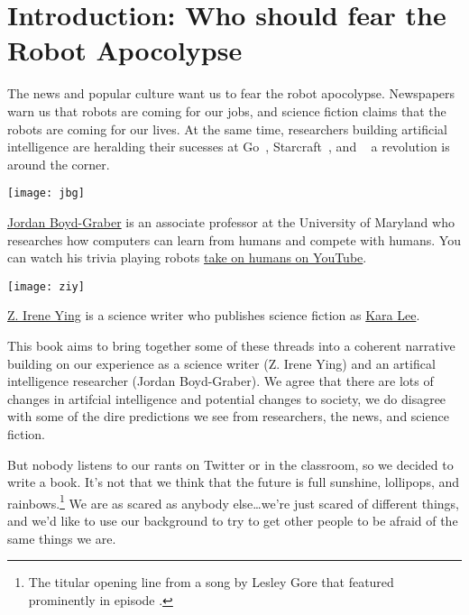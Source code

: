 \cleardoublepage
\chapter{Introduction: Who should fear the Robot Apocolypse}

The news and popular culture want us to fear the robot apocolypse.  Newspapers warn us that robots are coming for our jobs, and science fiction claims that the robots are coming for our lives.  At the same time, researchers building artificial intelligence are heralding their sucesses at Go~\cite{silver-16}, Starcraft~\cite{vinyals2017starcraft}, and ~\cite{ferruci-10} a revolution is around the corner.

\begin{marginfigure}%
  \texttt{[image: jbg]}
  \caption{\href{http://boydgraber.org}{Jordan Boyd-Graber} is an associate professor at the University of Maryland who researches how computers can learn from humans and compete with humans.  You can watch his trivia playing robots \href{http://qanta.org/home/past-events}{take on humans on YouTube}.}
  \label{fig:marginfig}
\end{marginfigure}

\begin{marginfigure}%
  \texttt{[image: ziy]}
  \caption{\href{http://www.ireneying.net/}{Z. Irene Ying} is a science writer who publishes science fiction as \href{http://www.windupdreams.net/}{Kara Lee}.}
  \label{fig:marginfig}
\end{marginfigure}

This book aims to bring together some of these threads into a coherent narrative building on our experience as a science writer (Z. Irene Ying) and an artifical intelligence researcher (Jordan Boyd-Graber).  We agree that there are lots of changes in artifcial intelligence and potential changes to society, we do disagree with some of the dire predictions we see from researchers, the news, and science fiction.

But nobody listens to our rants on Twitter or in the classroom, so we decided to write a book.  It's not that we think that the future is full sunshine, lollipops, and rainbows.\footnote{The titular opening line from a song by Lesley Gore that featured prominently in  episode .}  We are as scared as anybody else\dots we're just scared of different things, and we'd like to use our background to try to get other people to be afraid of the same things we are.

